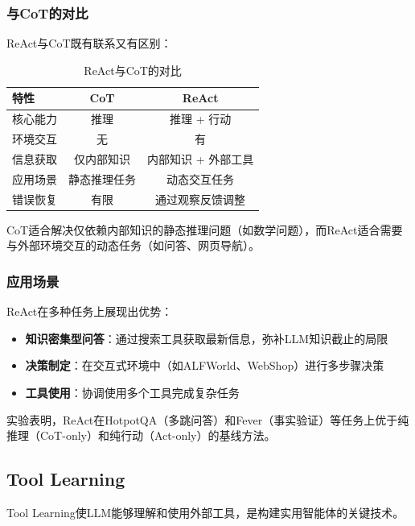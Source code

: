 \subsubsection{与CoT的对比}

ReAct与CoT既有联系又有区别：

\begin{table}[htbp]
    \centering
    \caption{ReAct与CoT的对比}\label{tab:react_vs_cot}
    \begin{tabular}{@{}lcc@{}}
        \toprule
        \textbf{特性} & \textbf{CoT} & \textbf{ReAct} \\
        \midrule
        核心能力 & 推理 & 推理 + 行动 \\
        环境交互 & 无 & 有 \\
        信息获取 & 仅内部知识 & 内部知识 + 外部工具 \\
        应用场景 & 静态推理任务 & 动态交互任务 \\
        错误恢复 & 有限 & 通过观察反馈调整 \\
        \bottomrule
    \end{tabular}
\end{table}

CoT适合解决仅依赖内部知识的静态推理问题（如数学问题），而ReAct适合需要与外部环境交互的动态任务（如问答、网页导航）。

\subsubsection{应用场景}

ReAct在多种任务上展现出优势：

\begin{itemize}[leftmargin=2em]
    \item \textbf{知识密集型问答}：通过搜索工具获取最新信息，弥补LLM知识截止的局限
    \item \textbf{决策制定}：在交互式环境中（如ALFWorld、WebShop）进行多步骤决策
    \item \textbf{工具使用}：协调使用多个工具完成复杂任务
\end{itemize}

实验表明，ReAct在HotpotQA（多跳问答）和Fever（事实验证）等任务上优于纯推理（CoT-only）和纯行动（Act-only）的基线方法。

\subsection{Tool Learning}

Tool Learning使LLM能够理解和使用外部工具，是构建实用智能体的关键技术。


